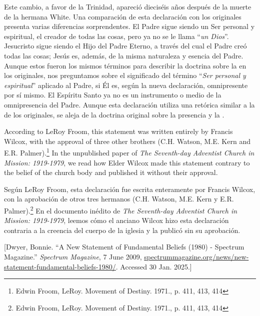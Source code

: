 Este cambio, a favor de la Trinidad, apareció dieciséis años después de la muerte de la hermana White. Una comparación de esta declaración con los  originales presenta varias diferencias sorprendentes. El Padre sigue siendo un Ser personal y espiritual, el creador de todas las cosas, pero ya no se le llama “\textit{un Dios}”. Jesucristo sigue siendo el Hijo del Padre Eterno, a través del cual el Padre creó todas las cosas; Jesús es, además, de la misma naturaleza y esencia del Padre. Aunque estos fueron los mismos términos para describir la doctrina sobre la  en los  originales, nos preguntamos sobre el significado del término “\textit{Ser personal y espiritual}” aplicado al Padre, si Él es, según la nueva declaración, omnipresente por sí mismo. El Espíritu Santo ya no es un instrumento o medio de la omnipresencia del Padre. Aunque esta declaración utiliza una retórica similar a la de los  originales, se aleja de la doctrina original sobre la presencia y la .


According to LeRoy Froom, this statement was written entirely by Francis Wilcox, with the approval of three other brothers (C.H. Watson, M.E. Kern and E.R. Palmer).\footnote{Edwin Froom, LeRoy. Movement of Destiny. 1971., p. 411, 413, 414} In the unpublished paper of \textit{The Seventh-day Adventist Church in Mission: 1919-1979}, we read how Elder Wilcox made this statement contrary to the belief of the church body and published it without their approval.


Según LeRoy Froom, esta declaración fue escrita enteramente por Francis Wilcox, con la aprobación de otros tres hermanos (C.H. Watson, M.E. Kern y E.R. Palmer).\footnote{Edwin Froom, LeRoy. Movement of Destiny. 1971., p. 411, 413, 414} En el documento inédito de \textit{The Seventh-day Adventist Church in Mission: 1919-1979}, leemos cómo el anciano Wilcox hizo esta declaración contraria a la creencia del cuerpo de la iglesia y la publicó sin su aprobación.


[Dwyer, Bonnie. “A New Statement of Fundamental Beliefs (1980) - Spectrum Magazine.” \textit{Spectrum Magazine}, 7 June 2009, \href{https://spectrummagazine.org/news/new-statement-fundamental-beliefs-1980/}{spectrummagazine.org/news/new-statement-fundamental-beliefs-1980/}. Accessed 30 Jan. 2025.]


